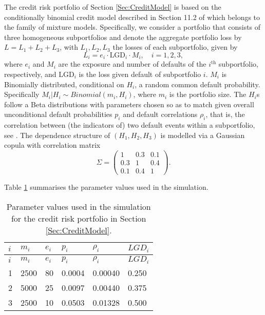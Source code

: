 \documentclass[
]{article}
\begin{document}
The credit risk portfolio of Section \ref{Sec:CreditModel} is based on the conditionally binomial credit model described in Section 11.2 of \citet{Mcneil2015B} which belongs to the family of mixture models. Specifically, we consider a portfolio that consists of three homogeneous subportfolios and denote the aggregate portfolio loss by \(L = L_1 + L_2+ L_3\), with \(L_1, L_2, L_3\) the losses of each subportfolio, given by
\begin{equation}
L_i=e_i\cdot\text{LGD}_i\cdot M_i,\quad i=1,2,3, 
\end{equation}
where \(e_i\) and \(M_i\) are the exposure and number of defaults of the \(i^{\text{th}}\) subportfolio, respectively, and \(\text{LGD}_i\) is the loss given default of subportfolio \(i\). \(M_i\) is Binomially distributed, conditional on \(H_i\), a random common default probability. Specifically \(M_i|H_i \sim Binomial(m_i,H_i)\), where \(m_i\) is the portfolio size. The \(H_i\)s follow a Beta distributions with parameters chosen so as to match given overall unconditional default probabilities \(p_i\) and default correlations \(\rho_i\), that is, the correlation between (the indicators of) two default events within a subportfolio, see \citet{Mcneil2015B}. The dependence structure of \((H_1,H_2,H_3)\) is modelled via a Gaussian copula with correlation matrix\\
\begin{equation}\Sigma = \begin{pmatrix}
1 & 0.3 & 0.1\\
0.3 & 1 & 0.4\\
0.1 & 0.4 & 1
\end{pmatrix}.\end{equation}

Table \ref{tab:credit} summarises the parameter values used in the simulation.

\begin{longtable}[]{@{}llllll@{}}
\caption{\label{tab:credit} Parameter values used in the simulation for the credit risk portfolio in Section \ref{Sec:CreditModel}.}\tabularnewline
\toprule
\(i\) & \(m_i\) & \(e_i\) & \(p_i\) & \(\rho_i\) & \(LGD_i\)\tabularnewline
\midrule
\endfirsthead
\toprule
\(i\) & \(m_i\) & \(e_i\) & \(p_i\) & \(\rho_i\) & \(LGD_i\)\tabularnewline
\midrule
\endhead
1 & 2500 & 80 & 0.0004 & 0.00040 & 0.250\tabularnewline
2 & 5000 & 25 & 0.0097 & 0.00440 & 0.375\tabularnewline
3 & 2500 & 10 & 0.0503 & 0.01328 & 0.500\tabularnewline
\bottomrule
\end{longtable}
\end{document}
